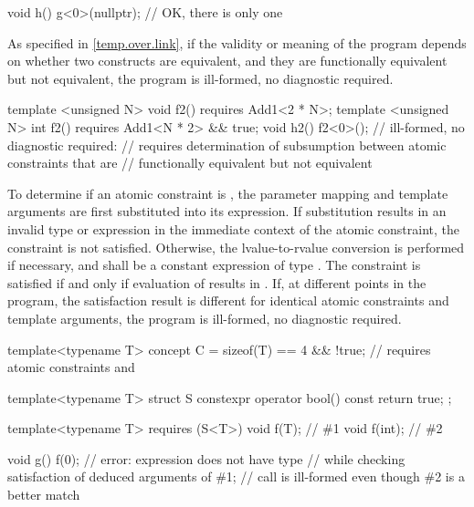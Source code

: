 \documentclass{wg21}
\begin{document}
\begin{note}
\begin{example}
\begin{codeblock}
            void h() {
                g<0>(nullptr);    // OK, there is only one 
            }
        \end{codeblock}
    \end{example}
    As specified in \ref{temp.over.link},
    if the validity or meaning of the program depends on
    whether two constructs are equivalent, and
    they are functionally equivalent but not equivalent,
    the program is ill-formed, no diagnostic required.
    \begin{example}
        \begin{codeblock}
            template <unsigned N> void f2()
            requires Add1<2 * N>;
            template <unsigned N> int f2()
            requires Add1<N * 2> && true;
            void h2() {
                f2<0>();          // ill-formed, no diagnostic required:
                // requires determination of subsumption between atomic constraints that are
                // functionally equivalent but not equivalent
            }
        \end{codeblock}
    \end{example}
\end{note}

\pnum
To determine if an atomic constraint is
,
the parameter mapping and template arguments are
first substituted into its expression.
If substitution results in an invalid type or expression
in the immediate context of the atomic constraint,
the constraint is not satisfied.
Otherwise, the lvalue-to-rvalue conversion
is performed if necessary,
and  shall be a constant expression of type .
The constraint is satisfied if and only if evaluation of 
results in .
If, at different points in the program, the satisfaction result is different
for identical atomic constraints and template arguments,
the program is ill-formed, no diagnostic required.
\begin{example}
    \begin{codeblock}
        template<typename T> concept C =
        sizeof(T) == 4 && !true;      // requires atomic constraints  and 

        template<typename T> struct S {
            constexpr operator bool() const { return true; }
        };

        template<typename T> requires (S<T>{})
        void f(T);                      // \#1
        void f(int);                    // \#2

        void g() {
            f(0);                         // error: expression  does not have type 
        }                               // while checking satisfaction of deduced arguments of \#1;
        // call is ill-formed even though \#2 is a better match
    \end{codeblock}
\end{example}
\end{document}
